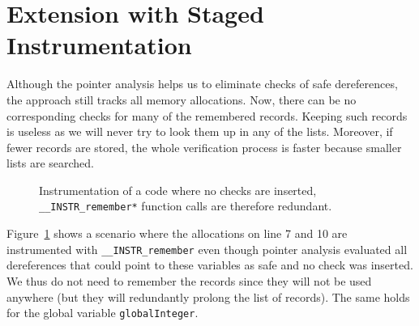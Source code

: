 \section{Extension with Staged Instrumentation}\label{sec:staged}
%
Although the pointer analysis helps us to eliminate checks of safe
dereferences, the approach still tracks all memory allocations.
Now, there can be no corresponding checks for many of the remembered records.
Keeping such records is useless as we will never try to look them up in any of the lists.
Moreover, if fewer records are stored, the whole verification process is faster
because smaller lists are searched.

\begin{figure}[t]

\caption{Instrumentation of a code where no checks are inserted, \texttt{\_\_INSTR\_remember*} function calls are therefore redundant.}
\label{fig:exampleNoRemember}
\end{figure}

Figure~\ref{fig:exampleNoRemember} shows a scenario where the allocations on
line 7 and 10 are instrumented with \texttt{\_\_INSTR\_remember} even though
pointer analysis evaluated all dereferences that could point to these variables
as safe and no check was inserted. We thus do not need to remember the records
since they will not be used anywhere (but they will redundantly prolong the
list of records). The same holds for the global variable
\texttt{globalInteger}.

